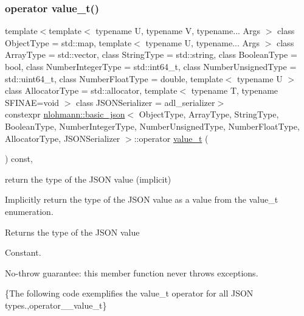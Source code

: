 \subsubsection{\texorpdfstring{operator value\+\_\+t()}{operator value\_t()}}
{\footnotesize\ttfamily template$<$template$<$ typename U, typename V, typename... Args $>$ class Object\+Type = std\+::map, template$<$ typename U, typename... Args $>$ class Array\+Type = std\+::vector, class String\+Type  = std\+::string, class Boolean\+Type  = bool, class Number\+Integer\+Type  = std\+::int64\+\_\+t, class Number\+Unsigned\+Type  = std\+::uint64\+\_\+t, class Number\+Float\+Type  = double, template$<$ typename U $>$ class Allocator\+Type = std\+::allocator, template$<$ typename T, typename S\+F\+I\+N\+A\+E=void $>$ class J\+S\+O\+N\+Serializer = adl\+\_\+serializer$>$ \\
constexpr \mbox{\hyperlink{classnlohmann_1_1basic__json}{nlohmann\+::basic\+\_\+json}}$<$ Object\+Type, Array\+Type, String\+Type, Boolean\+Type, Number\+Integer\+Type, Number\+Unsigned\+Type, Number\+Float\+Type, Allocator\+Type, J\+S\+O\+N\+Serializer $>$\+::operator \mbox{\hyperlink{namespacenlohmann_1_1detail_a90aa5ef615aa8305e9ea20d8a947980f}{value\+\_\+t}} (\begin{DoxyParamCaption}{ }\end{DoxyParamCaption}) const\hspace{0.3cm}{\ttfamily [inline]}, {\ttfamily [noexcept]}}



return the type of the J\+S\+ON value (implicit) 

Implicitly return the type of the J\+S\+ON value as a value from the value\+\_\+t enumeration.

\begin{DoxyReturn}{Returns}
the type of the J\+S\+ON value
\end{DoxyReturn}
Constant.

No-\/throw guarantee\+: this member function never throws exceptions.

\{The following code exemplifies the value\+\_\+t operator for all J\+S\+ON types.,operator\+\_\+\+\_\+value\+\_\+t\}

